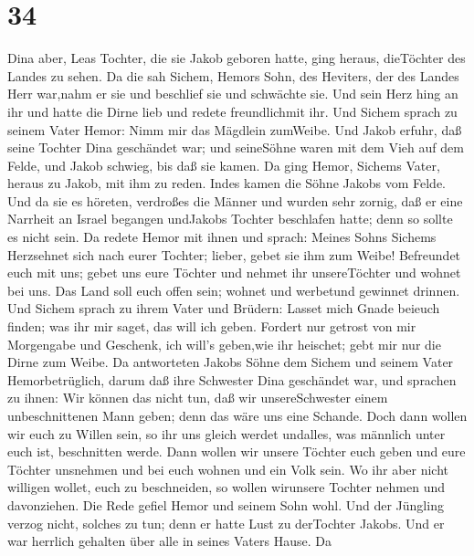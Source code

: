 \hypertarget{section-33}{%
\section{34}\label{section-33}}

 Dina aber, Leas Tochter, die sie Jakob geboren hatte, ging
heraus, dieTöchter des Landes zu sehen.  Da die sah Sichem,
Hemors Sohn, des Heviters, der des Landes Herr war,nahm er sie und
beschlief sie und schwächte sie.  Und sein Herz hing an ihr
und hatte die Dirne lieb und redete freundlichmit ihr.  Und
Sichem sprach zu seinem Vater Hemor: Nimm mir das Mägdlein zumWeibe.
 Und Jakob erfuhr, daß seine Tochter Dina geschändet war;
und seineSöhne waren mit dem Vieh auf dem Felde, und Jakob schwieg, bis
daß sie kamen.  Da ging Hemor, Sichems Vater, heraus zu
Jakob, mit ihm zu reden.  Indes kamen die Söhne Jakobs vom
Felde. Und da sie es höreten, verdroßes die Männer und wurden sehr
zornig, daß er eine Narrheit an Israel begangen undJakobs Tochter
beschlafen hatte; denn so sollte es nicht sein.  Da redete
Hemor mit ihnen und sprach: Meines Sohns Sichems Herzsehnet sich nach
eurer Tochter; lieber, gebet sie ihm zum Weibe!  Befreundet
euch mit uns; gebet uns eure Töchter und nehmet ihr unsereTöchter
 und wohnet bei uns. Das Land soll euch offen sein; wohnet
und werbetund gewinnet drinnen.  Und Sichem sprach zu ihrem
Vater und Brüdern: Lasset mich Gnade beieuch finden; was ihr mir saget,
das will ich geben.  Fordert nur getrost von mir Morgengabe
und Geschenk, ich will's geben,wie ihr heischet; gebt mir nur die Dirne
zum Weibe.  Da antworteten Jakobs Söhne dem Sichem und
seinem Vater Hemorbetrüglich, darum daß ihre Schwester Dina geschändet
war,  und sprachen zu ihnen: Wir können das nicht tun, daß
wir unsereSchwester einem unbeschnittenen Mann geben; denn das wäre uns
eine Schande.  Doch dann wollen wir euch zu Willen sein, so
ihr uns gleich werdet undalles, was männlich unter euch ist, beschnitten
werde.  Dann wollen wir unsere Töchter euch geben und eure
Töchter unsnehmen und bei euch wohnen und ein Volk sein. 
Wo ihr aber nicht willigen wollet, euch zu beschneiden, so wollen
wirunsere Tochter nehmen und davonziehen.  Die Rede gefiel
Hemor und seinem Sohn wohl.  Und der Jüngling verzog nicht,
solches zu tun; denn er hatte Lust zu derTochter Jakobs. Und er war
herrlich gehalten über alle in seines Vaters Hause.  Da
